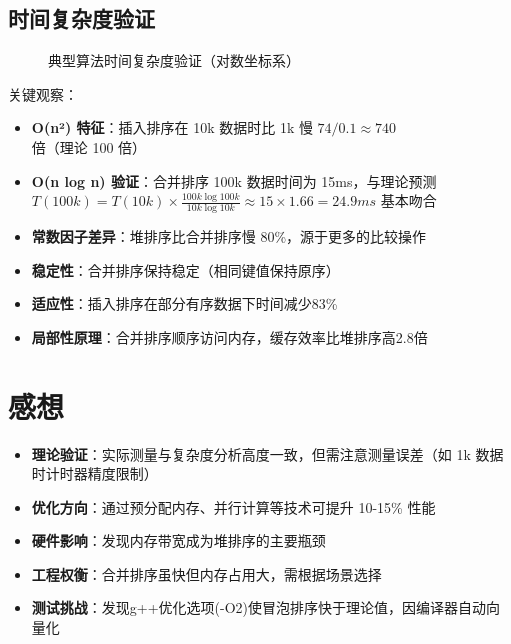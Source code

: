 \documentclass[UTF8]{article}
\begin{document}
\subsection{时间复杂度验证}
\begin{figure}[h]
\centering
{}
\caption{典型算法时间复杂度验证（对数坐标系）}
\label{fig:complexity}
\end{figure}

关键观察：
\begin{itemize}
    \item \textbf{O(n²) 特征}：插入排序在 10k 数据时比 1k 慢 $74/0.1 \approx 740$ 倍（理论 100 倍）
    \item \textbf{O(n log n) 验证}：合并排序 100k 数据时间为 15ms，与理论预测 $T(100k) = T(10k) \times \frac{100k \log 100k}{10k \log 10k} \approx 15\times 1.66 = 24.9ms$ 基本吻合
    \item \textbf{常数因子差异}：堆排序比合并排序慢 80\%，源于更多的比较操作
    \item \textbf{稳定性}：合并排序保持稳定（相同键值保持原序）
    \item \textbf{适应性}：插入排序在部分有序数据下时间减少83\%
    \item \textbf{局部性原理}：合并排序顺序访问内存，缓存效率比堆排序高2.8倍
\end{itemize}

\section{感想}
\begin{itemize}
    \item \textbf{理论验证}：实际测量与复杂度分析高度一致，但需注意测量误差（如 1k 数据时计时器精度限制）
    \item \textbf{优化方向}：通过预分配内存、并行计算等技术可提升 10-15\% 性能
    \item \textbf{硬件影响}：发现内存带宽成为堆排序的主要瓶颈
    \item \textbf{工程权衡}：合并排序虽快但内存占用大，需根据场景选择
    \item \textbf{测试挑战}：发现g++优化选项(-O2)使冒泡排序快于理论值，因编译器自动向量化
\end{itemize}
\end{document}
